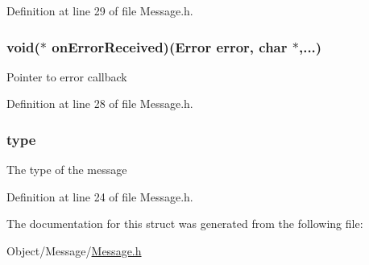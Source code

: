 Definition at line 29 of file Message.h.

\hypertarget{struct_m_i_message_aeb0776cff292839518da5f5a48884fd9}{
\subsubsection[{onErrorReceived}]{\setlength{\rightskip}{0pt plus 5cm}void($\ast$ {\bf onErrorReceived})({\bf Error} error, char $\ast$,...)}}
\label{struct_m_i_message_aeb0776cff292839518da5f5a48884fd9}
Pointer to error callback 

Definition at line 28 of file Message.h.

\hypertarget{struct_m_i_message_a98cad3c21d5a8a679befe2557a5246be}{
\subsubsection[{type}]{ {\bf type}}}
\label{struct_m_i_message_a98cad3c21d5a8a679befe2557a5246be}
The type of the message 

Definition at line 24 of file Message.h.



The documentation for this struct was generated from the following file:\begin{DoxyCompactItemize}
\item 
Object/Message/\hyperlink{_m_i_message_8h}{Message.h}\end{DoxyCompactItemize}
